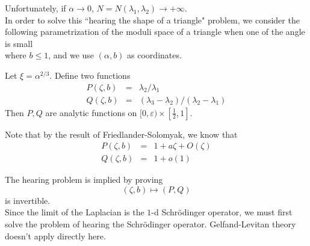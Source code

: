 Unfortunately, if $\alpha\rightarrow 0$, $N = N(\lambda_1,\lambda_2)\rightarrow
+\infty$.
\\

In order to solve this ``hearing the shape of a triangle" problem, we consider
the following parametrization of the moduli space of a triangle when one of the
angle is small
\\%
where $b\leqslant 1$, and we use $(\alpha, b)$ as coordinates.
\begin{conjecture}
Let $\xi = \alpha^{2/3}$. Define two functions
\begin{eqnarray}
\nonumber P(\zeta, b) & = & \lambda_2 / \lambda_1 \\
\nonumber Q(\zeta, b) & = & (\lambda_3 - \lambda_2)/(\lambda_2 - \lambda_1)
\end{eqnarray}
Then $P,Q$ are analytic functions on $[0, \varepsilon) \times[\frac{1}{2}, 1]$.
\end{conjecture}

Note that by the result of Friedlander-Solomyak, we know that
\begin{eqnarray}
\nonumber P(\zeta, b) & = & 1 + a\zeta + O(\zeta) \\
\nonumber Q(\zeta, b) & = & 1 + o(1)
\end{eqnarray}

The hearing problem is implied by proving
\[
(\zeta, b) \mapsto (P,Q)
\]
is invertible.
\\

Since the limit of the Laplacian is the $1$-d Schr\"{o}dinger operator, we must
first solve the problem of hearing the Schr\"{o}dinger operator. Gelfand-Levitan
theory doesn't apply directly here.


